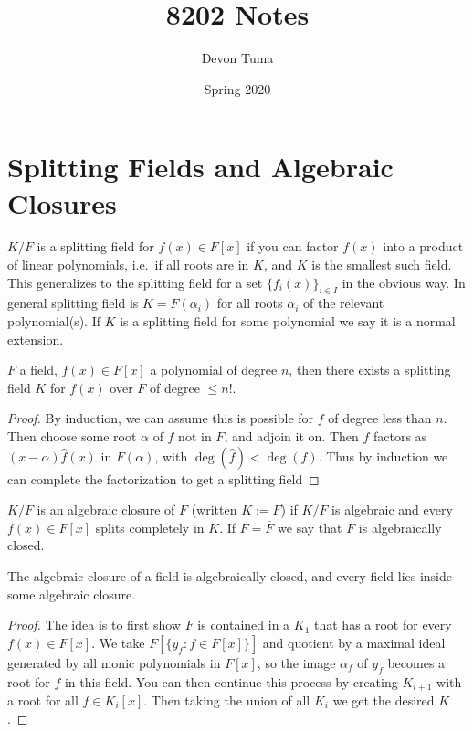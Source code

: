 \documentclass[11pt]{article}
\title{8202 Notes}
\author{Devon Tuma}
\date{Spring 2020}
\begin{document}
\maketitle

\section*{Splitting Fields and Algebraic Closures}

\begin{definition}
  $K/F$ is a splitting field for $f(x) \in F[x]$ if you can factor $f(x)$ into a product of linear polynomials, i.e.\ if all roots are in $K$, and $K$ is the smallest such field.
  This generalizes to the splitting field for a set $\{f_i(x)\}_{i \in I}$ in the obvious way.
  In general splitting field is $K = F(\alpha_i)$ for all roots $\alpha_i$ of the relevant polynomial(s).
  If $K$ is a splitting field for some polynomial we say it is a normal extension.
\end{definition}

\begin{theorem}
  $F$ a field, $f(x) \in F[x]$  a polynomial of degree $n$, then there exists a splitting field $K$ for $f(x)$ over $F$ of degree $\le n!$.
\end{theorem}
\begin{proof}
  By induction, we can assume this is possible for $f$ of degree less than $n$.
  Then choose some root $\alpha$ of $f$ not in $F$, and adjoin it on.
  Then $f$ factors as $(x - \alpha)\hat{f}(x)$ in $F(\alpha)$, with $\deg(\hat{f}) < \deg(f)$.
  Thus by induction we can complete the factorization to get a splitting field
\end{proof}

\begin{definition}
  $K/F$ is an algebraic closure of $F$ (written $K := \bar{F}$) if $K/F$ is algebraic and every $f(x) \in F[x]$ splits completely in $K$.
  If $F = \bar{F}$ we say that $F$ is algebraically closed.
\end{definition}

\begin{theorem}
  The algebraic closure of a field is algebraically closed, and every field lies inside some algebraic closure.
\end{theorem}
\begin{proof}
  The idea is to first show $F$ is contained in a $K_1$ that has a root for every $f(x) \in F[x]$. We take $F[\{y_f : f \in F[x]\}]$ and quotient by a maximal ideal generated by all monic polynomials in $F[x]$, so the image $\alpha_f$ of $y_f$ becomes a root for $f$ in this field. You can then continue this process by creating $K_{i+1}$ with a root for all $f \in K_i[x]$. Then taking the union of all $K_i$ we get the desired $K$.
\end{proof}
\end{document}
